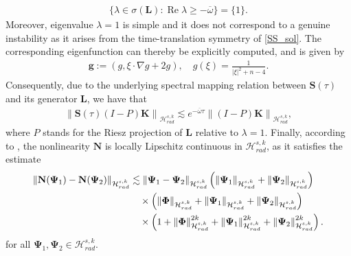 \documentclass[12pt,reqno]{amsart}
\theoremstyle{plain}
\theoremstyle{remark}
\theoremstyle{plain}
\theoremstyle{definition}
\numberwithin{equation}{section}
\numberwithin{equation}{section}
\renewcommand{\Re}{\operatorname{Re}}
\newcommand{\la}{\lambda}
\newcommand{\norm}[1]{\left\|#1\right\|}
\newcommand{\HH}{\mathcal{H}}
\begin{document}
	\begin{align}\label{spectrum_L}
		\{\lambda \in \sigma(\mathbf{L}):\Re \lambda\geq -\overline{\omega}\}=\{1\}.
	\end{align}
	Moreover, eigenvalue $\la=1$ is simple and it does not correspond to a genuine instability as it arises from the time-translation symmetry of \eqref{SS_sol}. The corresponding eigenfunction can thereby be explicitly computed, and is given by
	\begin{align*}
		\mathbf{g}:=(g,\xi\cdot\nabla g+2g),\quad g(\xi)=\frac{1}{\lvert \xi\rvert^2+n-4}.
	\end{align*}
	Consequently, due to the underlying spectral mapping relation between $\mathbf{S}(\tau)$ and its generator $\mathbf{L}$, we have that
    \begin{align}\label{decay_semigroup}
		\norm{\mathbf{S}(\tau)(I-P)\mathbf{K}}_{\HH_{rad}^{s,k}}\lesssim e^{-\overline{\omega}\tau} \norm{(I-P)\mathbf{K}}_{\HH_{rad}^{s,k}},
	\end{align}
    where $P$ stands for the Riesz projection of $\mathbf{L}$ relative to $\la=1$.
	Finally, according to \cite[Lemma 7.1 and Proposition A.1]{glogic2025globally}, the nonlinearity $\mathbf{N}$ is locally Lipschitz continuous in $\HH_{rad}^{s,k}$, as it satisfies the estimate
	\begin{align}\label{estimate_nonlinearity_selfsimilar}
		\norm{\mathbf{N}(\mathbf{\Psi}_1)-\mathbf{N}(\mathbf{\Psi}_2)}_{\HH_{rad}^{s,k}}&\lesssim \norm{\mathbf{\Psi}_1-\mathbf{\Psi}_2}_{\HH_{rad}^{s,k}}\left(\norm{\mathbf{\Psi}_1}_{\HH_{rad}^{s,k}}+\norm{\mathbf{\Psi}_2}_{\HH_{rad}^{s,k}}\right)\\ & \quad \times\left(\norm{\mathbf{\Phi}}_{\HH_{rad}^{s,k}}+\norm{\mathbf{\Psi}_1}_{\HH_{rad}^{s,k}}+\norm{\mathbf{\Psi}_2}_{\HH_{rad}^{s,k}}\right)\notag\\ &\quad  \times \left(1+\norm{\mathbf{\Phi}}_{\HH_{rad}^{s,k}}^{2k}+\norm{\mathbf{\Psi}_1}_{\HH_{rad}^{s,k}}^{2k}+\norm{\mathbf{\Psi}_2}_{\HH_{rad}^{s,k}}^{2k}\right).\notag
	\end{align}
    for all $\mathbf{\Psi}_1,\mathbf{\Psi}_2 \in \HH_{rad}^{s,k}$.
\end{document}
